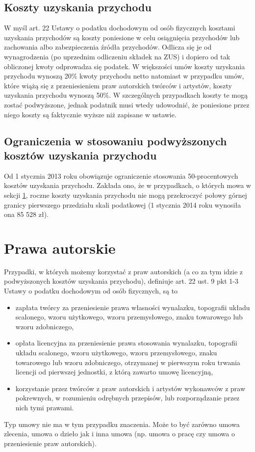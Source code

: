 \subsection[Koszty uzyskania przychodu][Koszty uzyskania przychodu]{Koszty uzyskania przychodu}
W myśl art. 22 Ustawy o podatku dochodowym od osób fizycznych\cite{ustawaOPodatkuDochodowym} kosztami uzyskania przychodów są koszty poniesione w celu osiągnięcia przychodów lub zachowania albo zabezpieczenia źródła przychodów. Odlicza się je od wynagrodzenia (po uprzednim odliczeniu składek na ZUS) i dopiero od tak obliczonej kwoty odprowadza się podatek. W większości umów koszty uzyskania przychodu wynoszą 20\% kwoty przychodu netto natomiast w przypadku umów, które wiążą się z przeniesieniem praw autorskich twórców i artystów, koszty uzyskania przychodu wynoszą 50\%. W szczególnych przypadkach koszty te mogą zostać podwyższone, jednak podatnik musi wtedy udowodnić, że poniesione przez niego koszty są faktycznie wyższe niż zapisane w ustawie.

\subsection[Ograniczenia w stosowaniu podwyższonych kosztów uzyskania przychodu][Ograniczenia w stosowaniu podwyższonych kosztów uzyskania przychodu]{Ograniczenia w stosowaniu podwyższonych kosztów uzyskania przychodu}
Od 1 stycznia 2013 roku obowiązuje ograniczenie stosowania 50-procentowych kosztów uzyskania przychodu. Zakłada ono, że  w przypadkach, o których mowa w sekcji \ref{prawaAutorskie}, roczne koszty uzyskania przychodu nie mogą przekroczyć połowy górnej granicy pierwszego przedziału skali podatkowej (1 stycznia 2014 roku wynosiła ona 85 528 zł).

\section[Prawa autorskie][Prawa autorskie]{Prawa autorskie}
\label{prawaAutorskie}
Przypadki, w których możemy korzystać z praw autorskich (a co za tym idzie z podwyższonych kosztów uzyskania przychodu), definiuje art. 22 ust. 9 pkt 1-3 Ustawy o podatku dochodowym od osób fizycznych\cite{ustawaOPodatkuDochodowym}, są to
\begin{itemize}
	\item  zapłata twórcy za przeniesienie prawa własności wynalazku, topografii układu scalonego, wzoru użytkowego, wzoru przemysłowego, znaku towarowego lub wzoru zdobniczego,
	\item opłata licencyjna za przeniesienie prawa stosowania wynalazku, topografii układu scalonego, wzoru użytkowego, wzoru przemysłowego, znaku towarowego lub wzoru zdobniczego, otrzymanej w pierwszym roku trwania licencji od pierwszej jednostki, z którą zawarto umowę licencyjną,
	\item korzystanie przez twórców z praw autorskich i artystów wykonawców z praw pokrewnych, w rozumieniu odrębnych przepisów, lub rozporządzanie przez nich tymi prawami.
\end{itemize}
Typ umowy nie ma w tym przypadku znaczenia. Może to być zarówno umowa zlecenia, umowa o dzieło jak i inna umowa (np. umowa o pracę czy umowa o przeniesienie praw autorskich).

